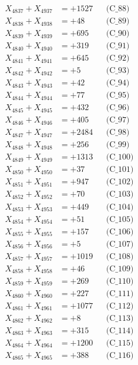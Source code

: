 \documentclass[a4paper,10pt]{article}
\begin{document}
{\begin{align}
X_{4837} + X_{4937} &= +1527 && \text{(C\_88)} \\
X_{4838} + X_{4938} &= +48 && \text{(C\_89)} \\
X_{4839} + X_{4939} &= +695 && \text{(C\_90)} \\
\allowbreak
X_{4840} + X_{4940} &= +319 && \text{(C\_91)} \\
X_{4841} + X_{4941} &= +645 && \text{(C\_92)} \\
X_{4842} + X_{4942} &= +5 && \text{(C\_93)} \\
X_{4843} + X_{4943} &= +42 && \text{(C\_94)} \\
X_{4844} + X_{4944} &= +77 && \text{(C\_95)} \\
\allowbreak
X_{4845} + X_{4945} &= +432 && \text{(C\_96)} \\
X_{4846} + X_{4946} &= +405 && \text{(C\_97)} \\
X_{4847} + X_{4947} &= +2484 && \text{(C\_98)} \\
X_{4848} + X_{4948} &= +256 && \text{(C\_99)} \\
X_{4849} + X_{4949} &= +1313 && \text{(C\_100)} \\
\allowbreak
X_{4850} + X_{4950} &= +37 && \text{(C\_101)} \\
X_{4851} + X_{4951} &= +947 && \text{(C\_102)} \\
X_{4852} + X_{4952} &= +70 && \text{(C\_103)} \\
X_{4853} + X_{4953} &= +449 && \text{(C\_104)} \\
X_{4854} + X_{4954} &= +51 && \text{(C\_105)} \\
\allowbreak
X_{4855} + X_{4955} &= +157 && \text{(C\_106)} \\
X_{4856} + X_{4956} &= +5 && \text{(C\_107)} \\
X_{4857} + X_{4957} &= +1019 && \text{(C\_108)} \\
X_{4858} + X_{4958} &= +46 && \text{(C\_109)} \\
X_{4859} + X_{4959} &= +269 && \text{(C\_110)} \\
\allowbreak
X_{4860} + X_{4960} &= +227 && \text{(C\_111)} \\
X_{4861} + X_{4961} &= +1077 && \text{(C\_112)} \\
X_{4862} + X_{4962} &= +8 && \text{(C\_113)} \\
X_{4863} + X_{4963} &= +315 && \text{(C\_114)} \\
X_{4864} + X_{4964} &= +1200 && \text{(C\_115)} \\
\allowbreak
X_{4865} + X_{4965} &= +388 && \text{(C\_116)} \\

\end{align}}
\end{document}
